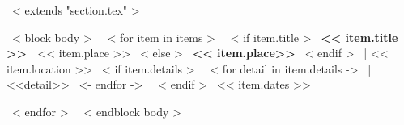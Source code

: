 ~< extends "section.tex" >~

~< block body >~
    ~< for item in items >~
      ~< if item.title >~
      \textbf{<< item.title >>} | << item.place >>
      ~< else >~
      \textbf{<< item.place>>}
      ~< endif >~
      | << item.location >>
        ~< if item.details >~
        ~< for detail in item.details ->~
            | <<detail>>
        ~<- endfor ->~
        ~< endif >~
        \hfill << item.dates >> \par
    ~< endfor >~
~< endblock body >~
